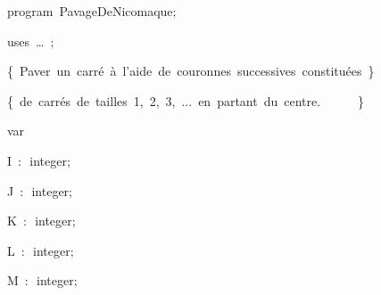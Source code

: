 
{
\parindent {}
\medskip

\carrenoir
\vspace{\neglskip}\mbox{\blc  \idt  \mcl program\idt \ PavageDeNicomaque$;$
}\par 
\vspace{\neglskip}\mbox{\blc \blk\idt \mcl uses\idt \ \ldots\ $;$
}\par 
\medskip

\vspace{\neglskip}\mbox{\blc  \blk\idt  \cmt  \{\ Paver\ un\ carré\ à\ l{'}aide\ de\ couronnes\ successives\ constituées\ \}\idt }\par 
\vspace{\neglskip}\mbox{\blc  \blk\idt  \cmt  \{\ de\ carrés\ de\ tailles\ 1,\ 2,\ 3,\ ...\ en\ partant\ du\ centre.\ \ \ \ \ \ \}\idt }\par 
\medskip

\pagebreak[3] 
\vspace{\neglskip}\mbox{\blc  \blk\idt  \mcl var\idt }\par 
\vspace{\neglskip}\mbox{\blc  \blk\blk\idt  I\ $:$\ integer$;$}\par 
\vspace{\neglskip}\mbox{\blc  \blk\blk\idt  J\ $:$\ integer$;$}\par 
\vspace{\neglskip}\mbox{\blc  \blk\blk\idt  K\ $:$\ integer$;$}\par 
\vspace{\neglskip}\mbox{\blc  \blk\blk\idt  L\ $:$\ integer$;$}\par 
\vspace{\neglskip}\mbox{\blc  \blk\blk\idt  M\ $:$\ integer$;$}\par 
\medskip

}
